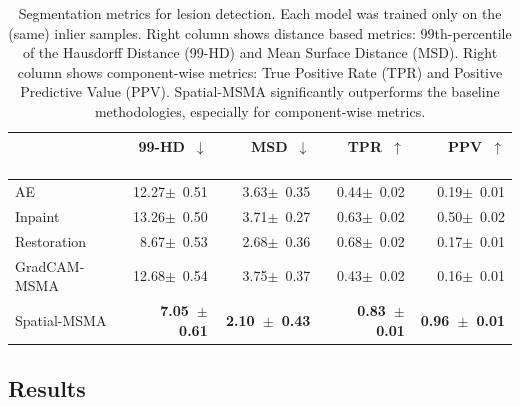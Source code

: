 \begin{table}[!ht]
\centering
\begin{tabular}{lrr|rr}
{} &        99-HD~$\downarrow$~~&      MSD~$\downarrow$~~~~~&        TPR~$\uparrow$~~~~&             PPV~$\uparrow$~~~~~\\
\midrule
AE~\citep{aelu2023} &  12.27$\pm$~0.51 &  3.63$\pm$~0.35 &  0.44$\pm$~0.02 &  0.19$\pm$~0.01 \\
Inpaint~\citep{liuUnsupervisedOutofDistributionDetection2023}       &  13.26$\pm$~0.50 &  3.71$\pm$~0.27 &  0.63$\pm$~0.02 &  0.50$\pm$~0.02 \\
Restoration~\citep{wyattAnoddpmAnomalyDetection2022}  &   8.67$\pm$~0.53 &  2.68$\pm$~0.36 &  0.68$\pm$~0.02 &  0.17$\pm$~0.01 \\
GradCAM-MSMA &  12.68$\pm$~0.54 &  3.75$\pm$~0.37 &  0.43$\pm$~0.02 &  0.16$\pm$~0.01 \\
Spatial-MSMA &  \textbf{7.05~$\pm$~0.61} &  \textbf{2.10~$\pm$~0.43} &  \textbf{0.83~$\pm$~0.01} &  \textbf{0.96~$\pm$~0.01} \\
\end{tabular}

\caption{Segmentation metrics for lesion detection. Each model was trained only on the (same) inlier samples. Right column shows distance based metrics: 99th-percentile of the Hausdorff Distance (99-HD) and Mean Surface Distance (MSD). Right column shows component-wise metrics: True Positive Rate (TPR) and Positive Predictive Value (PPV). Spatial-MSMA significantly outperforms the baseline methodologies, especially for component-wise metrics. }
\label{lesion_results}
\end{table}

\subsection*{Results}

